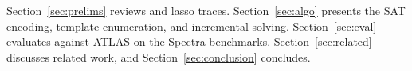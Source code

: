 Section~\ref{sec:prelims} reviews \GRone and lasso traces.
Section~\ref{sec:algo} presents the SAT encoding, template
enumeration, and incremental solving.
Section~\ref{sec:eval} evaluates \toolname against ATLAS on the
Spectra benchmarks.
Section~\ref{sec:related} discusses related work, and
Section~\ref{sec:conclusion} concludes.

